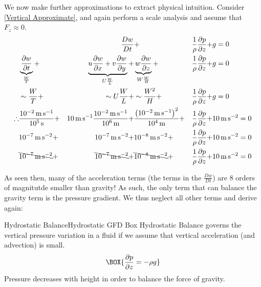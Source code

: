 We now make further approximations to extract physical intuition. Consider \ref{Vertical Approximate}, and again perform a scale analysis and assume that $F_z\approx 0$.
\begin{align*}
    &&\frac{Dw}{Dt} &+
    & \frac{1}{\rho}\frac{\partial p}{\partial z}+
    &g=0
    \\
    &\underbrace{\frac{\partial w}{\partial t}}_{\frac{W}{T}}+ 
    &\underbrace{u\frac{\partial w}{\partial x} 
    + v\frac{\partial w}{\partial y}}_{U\frac{W}{L}}+ 
    &\underbrace{w\frac{\partial w}{\partial z}}_{W\frac{W}{H}}+ 
    &\frac{1}{\rho}\frac{\partial p}{\partial z}+
    &g=0
    \\
    &\sim\frac{W}{T}+
    &\sim U\frac{W}{L}+
    &\sim\frac{W^2}{H}+ 
    &\frac{1}{\rho}\frac{\partial p}{\partial z}+
    &g=0
    \\
    \therefore
    &\frac{\text{\qty{e-2}{\metre\per\second}}}{\text{\qty{e5}{\second}}}+ 
    &\text{\qty{10}{\metre\per\second}}\frac{\text{\qty{e-2}{\metre\per\second}}}{\text{\qty{e6}{\metre}}}+ 
    &\frac{\left( \text{\qty{e-2}{\metre\per\second}} \right)^2}{\text{\qty{e4}{\metre}}}+ 
    &\frac{1}{\rho}\frac{\partial p}{\partial z}+
    &\text{\qty{10}{\metre\per\second\squared}}=0
    \\
    &\text{\qty{e-7}{\metre\per\second\squared}}+
    &\text{\qty{e-7}{\metre\per\second\squared}}+
    &\text{\qty{e-8}{\metre\per\second\squared}}+
    &\frac{1}{\rho}\frac{\partial p}{\partial z}+
    &\text{\qty{10}{\metre\per\second\squared}}=0
    \\
    &\bcancel{\text{\qty{e-7}{\metre\per\second\squared}}}+
    &\bcancel{\text{\qty{e-7}{\metre\per\second\squared}}}+
    &\bcancel{\text{\qty{e-8}{\metre\per\second\squared}}}+
    &\frac{1}{\rho}\frac{\partial p}{\partial z}+
    &\text{\qty{10}{\metre\per\second\squared}}=0
\end{align*}

As seen then, many of the acceleration terms (the terms in the $\frac{Dw}{Dt}$) are 8 orders of magnitutde smaller than gravity! As such, the only term that can balance the gravity term is the pressure gradient. We thus neglect all other terms and derive again:

\begin{fact}{Hydrostatic Balance}{Hydrostatic GFD Box}\label{Hydrostatic GFD Box}
Hydrostatic Balance governs the vertical pressure variation in a fluid if we assume that vertical acceleration (and advection) is small.
    \begin{equation}\label{Hydrostatic GFD}
    \BOX{
        \frac{\partial p}{\partial z}=-\rho g
    }
    \end{equation}
Pressure decreases with height in order to balance the force of gravity.
\end{fact}


